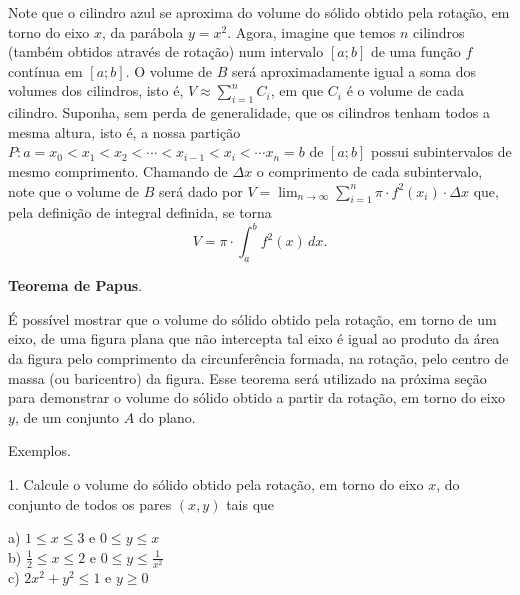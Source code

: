 \documentclass{article}
\begin{document}
{\begin{newpage}
\par Note que o cilindro azul se aproxima do volume do sólido obtido pela rotação, em torno do eixo $x$, da parábola $y=x^2$. Agora, imagine que temos $n$ cilindros (também obtidos através de rotação) num intervalo $[a;b]$ de uma função $f$ contínua em $[a;b]$. O volume de $B$ será aproximadamente igual a soma dos volumes dos cilindros, isto é, $V\approx \displaystyle{\sum_{i=1}^{n}C_i}$, em que $C_i$ é o volume de cada cilindro. Suponha, sem perda de generalidade, que os cilindros tenham todos a mesma altura, isto é, a nossa partição $P:a= x_0 < x_1 < x_2 < \cdots < x_{i-1} < x_i < \cdots x_n =b$ de $[a;b]$ possui subintervalos de mesmo comprimento. Chamando de $\Delta x$ o comprimento de cada subintervalo, note que o volume de $B$ será dado por $\displaystyle{V = \lim_{n\to \infty }\sum_{i=1}^{n} \pi\cdot f^{2}(x_{i})\cdot\Delta x}$  que, pela definição de integral definida, se torna $$V=\pi\cdot\int_{a}^{b} f^{2}(x)\, dx.$$
\par
\vspace{0.3cm}
\textbf{Teorema de Papus}.\par
É possível mostrar que o volume do sólido obtido pela rotação, em torno de um eixo, de uma figura plana que não intercepta tal eixo é igual ao produto da área da figura pelo comprimento da circunferência formada, na rotação, pelo centro de massa (ou baricentro) da figura. Esse teorema será utilizado na próxima seção para demonstrar o volume do sólido obtido a partir da rotação, em torno do eixo $y$, de um conjunto $A$ do plano.
\par
\vspace{0.3cm}
Exemplos.
\par
\begin{flushleft}
1. Calcule o volume do sólido obtido pela rotação, em torno do eixo $x$, do conjunto de todos os pares $(x,y)$ tais que   
\end{flushleft}
\par
\begin{multicols}{3}
\hspace{-15pt}a) $\displaystyle{1\leq x\leq 3}$ e $\displaystyle{0\leq y\leq x}$\\
b) $\displaystyle{\frac{1}{2}\leq x\leq 2}$ e $\displaystyle{0\leq y\leq\frac{1}{x^2}}$\\
c) $\displaystyle{2x^{2} + y^{2}\leq 1}$ e $\displaystyle{y\geq 0}$
\end{multicols}
\par
\vspace{0.3cm}
\begin{flushleft}

\end{flushleft}
\end{newpage}}
\end{document}

